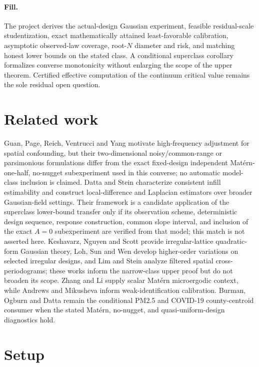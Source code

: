 \documentclass{article}
\begin{document}
\paragraph{Fill.} The project derives the actual-design Gaussian experiment, feasible residual-scale studentization, exact mathematically attained least-favorable calibration, asymptotic observed-law coverage, root-\(N\) diameter and risk, and matching honest lower bounds on the stated class. A conditional superclass corollary formalizes converse monotonicity without enlarging the scope of the upper theorem. Certified effective computation of the continuum critical value remains the sole residual open question.

\section{Related work}

Guan, Page, Reich, Ventrucci and Yang motivate high-frequency adjustment for spatial confounding, but their two-dimensional noisy/common-range or parsimonious formulations differ from the exact fixed-design independent Mat\'ern-one-half, no-nugget subexperiment used in this converse; no automatic model-class inclusion is claimed. Datta and Stein characterize consistent infill estimability and construct local-difference and Laplacian estimators over broader Gaussian-field settings. Their framework is a candidate application of the superclass lower-bound transfer only if its observation scheme, deterministic design sequence, response construction, common slope interval, and inclusion of the exact \(A=0\) subexperiment are verified from that model; this match is not asserted here. Keshavarz, Nguyen and Scott provide irregular-lattice quadratic-form Gaussian theory, Loh, Sun and Wen develop higher-order variations on selected irregular designs, and Lim and Stein analyze filtered spatial cross-periodograms; these works inform the narrow-class upper proof but do not broaden its scope. Zhang and Li supply scalar Mat\'ern microergodic context, while Andrews and Mikusheva inform weak-identification calibration. Burman, Ogburn and Datta remain the conditional PM2.5 and COVID-19 county-centroid consumer when the stated Mat\'ern, no-nugget, and quasi-uniform-design diagnostics hold.

\section{Setup}
\end{document}
